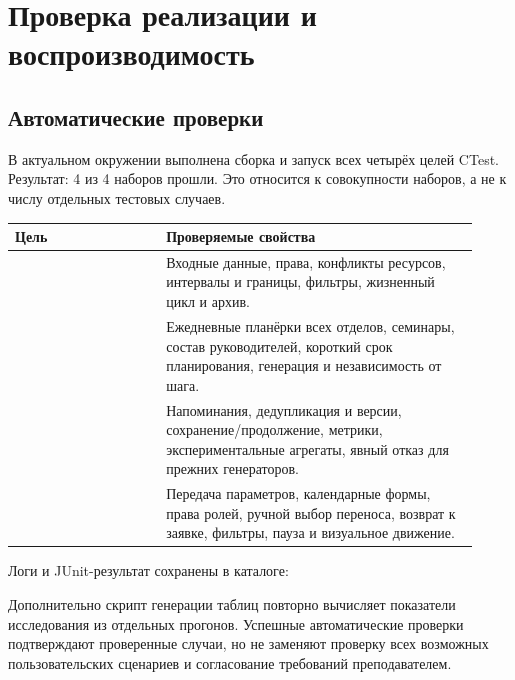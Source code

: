 \section{Проверка реализации и воспроизводимость}
\subsection{Автоматические проверки}
В актуальном окружении выполнена сборка и запуск всех четырёх целей CTest. Результат: 4 из 4 наборов прошли. Это относится к совокупности наборов, а не к числу отдельных тестовых случаев.
\begin{longtable}{L{0.3\linewidth}L{0.62\linewidth}}
\toprule Цель & Проверяемые свойства \\\midrule\endhead
{} & Входные данные, права, конфликты ресурсов, интервалы и границы, фильтры, жизненный цикл и архив. \\
 & Ежедневные планёрки всех отделов, семинары, состав руководителей, короткий срок планирования, генерация и независимость от шага. \\
 & Напоминания, дедупликация и версии, сохранение/продолжение, метрики, экспериментальные агрегаты, явный отказ для прежних генераторов. \\
 & Передача параметров, календарные формы, права ролей, ручной выбор переноса, возврат к заявке, фильтры, пауза и визуальное движение. \\
\bottomrule
\end{longtable}
Логи и JUnit-результат сохранены в каталоге:\begin{quote}\end{quote}Дополнительно скрипт генерации таблиц повторно вычисляет показатели исследования из отдельных прогонов. Успешные автоматические проверки подтверждают проверенные случаи, но не заменяют проверку всех возможных пользовательских сценариев и согласование требований преподавателем.

